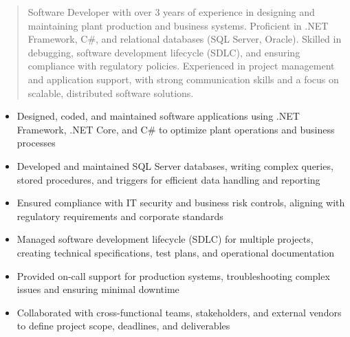 



\makecvheader

\begin{quote}
  \noindent
  Software Developer with over 3 years of experience in designing and maintaining plant production and business systems. Proficient in .NET Framework, C#, and relational databases (SQL Server, Oracle). Skilled in debugging, software development lifecycle (SDLC), and ensuring compliance with regulatory policies. Experienced in project management and application support, with strong communication skills and a focus on scalable, distributed software solutions.
\end{quote}

\par\smallskip
\noindent
\begin{minipage}{20cm}
  \begin{minipage}{9.75cm}
    \begin{itemize}
      \item Designed, coded, and maintained software applications using .NET Framework, .NET Core, and C# to optimize plant operations and business processes
      \item Developed and maintained SQL Server databases, writing complex queries, stored procedures, and triggers for efficient data handling and reporting
      \item Ensured compliance with IT security and business risk controls, aligning with regulatory requirements and corporate standards
    \end{itemize}
  \end{minipage}
  \hfill
  \begin{minipage}{9.75cm}
    \begin{itemize}
      \item Managed software development lifecycle (SDLC) for multiple projects, creating technical specifications, test plans, and operational documentation
      \item Provided on-call support for production systems, troubleshooting complex issues and ensuring minimal downtime
      \item Collaborated with cross-functional teams, stakeholders, and external vendors to define project scope, deadlines, and deliverables
    \end{itemize}
  \end{minipage}
\end{minipage}
\par\smallskip
\divider

